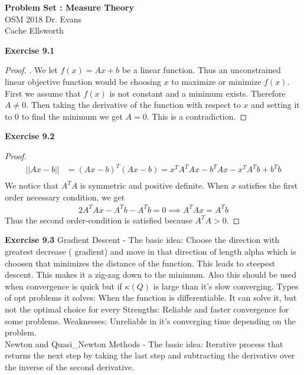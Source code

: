 \documentclass[letterpaper,12pt]{article}
\theoremstyle{definition}
\begin{document}
\begin{flushleft}
  \textbf{\large{Problem Set : Measure Theory}} \\
  OSM 2018 Dr. Evans \\
  Cache Ellsworth
  \end{flushleft}

\vspace{5mm}

\noindent\textbf{Exercise 9.1}
\begin{proof}. We let $f(x) = Ax + b$ be a linear function.  Thus an unconstrained linear objective function would be choosing $x$ to maximize or minimize $f(x)$.  First we assume that $f(x)$ is not constant and a minimum exists.  Therefore $A \neq 0$.  Then taking the derivative of the function with respect to $x$ and setting it to 0 to find the minimum we get $A = 0$.  This is a contradiction.
\end{proof}

\noindent\textbf{Exercise 9.2}
\begin{proof}
	\begin{align*}
		||Ax - b|| & = (Ax - b)^T(Ax - b) = x^TA^TAx - b^TAx - x^TA^Tb + b^Tb \\
	\end{align*}
	We notice that $A^TA$ is symmetric and positive definite.  When $x$ satisfies the first order necessary condition, we get 
	\begin{align*}
		2A^TAx -A^Tb - A^Tb = 0
		\implies A^TA x = A^T b
	\end{align*}
	Thus the second order-condition is satisfied because $A^TA > 0$.  
\end{proof}
\noindent\textbf{Exercise 9.3}
Gradient Descent - The basic idea: Choose the direction with greatest decrease ( gradient) and move in that direction of length alpha which is choosen that minimizes the distance of the function.  This leads to steepest descent. This makes it a zig-zag down to the minimum.  Also this should be used when convergence is quick but if $\kappa (Q)$ is large than it's slow converging. 
Types of opt problems it solves:  When the function is differentiable.  It can solve it, but not the optimal choice for every 
Strengths: Reliable and faster convergence for some problems. 
Weaknesses: Unreliable in it's converging time depending on the problem. \\
Newton and Quasi_Newton Methods - The basic idea: Iterative process that returns the next step by taking the last step and subtracting the derivative over the inverse of the second derivative. 
\end{document}
